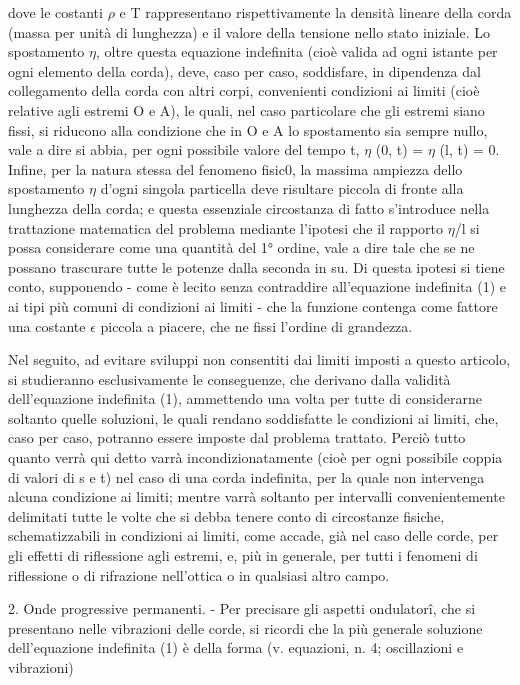 \documentclass[a4paper]{article}
\begin{document}
dove le costanti $\rho$ e T rappresentano rispettivamente la densità lineare della corda (massa per unità di lunghezza) e il valore della tensione nello stato iniziale. Lo spostamento $\eta$, oltre questa equazione indefinita (cioè valida ad ogni istante per ogni elemento della corda), deve, caso per caso, soddisfare, in dipendenza dal collegamento della corda con altri corpi, convenienti condizioni ai limiti (cioè relative agli estremi O e A), le quali, nel caso particolare che gli estremi siano fissi, si riducono alla condizione che in O e A lo spostamento sia sempre nullo, vale a dire si abbia, per ogni possibile valore del tempo t, $\eta$ (0, t) = $\eta$ (l, t) = 0. Infine, per la natura stessa del fenomeno fisic0, la massima ampiezza dello spostamento $\eta$ d'ogni singola particella deve risultare piccola di fronte alla lunghezza della corda; e questa essenziale circostanza di fatto s'introduce nella trattazione matematica del problema mediante l'ipotesi che il rapporto $\eta$/l si possa considerare come una quantità del 1° ordine, vale a dire tale che se ne possano trascurare tutte le potenze dalla seconda in su. Di questa ipotesi si tiene conto, supponendo - come è lecito senza contraddire all'equazione indefinita (1) e ai tipi più comuni di condizioni ai limiti - che la funzione contenga come fattore una costante $\epsilon$ piccola a piacere, che ne fissi l'ordine di grandezza.

Nel seguito, ad evitare sviluppi non consentiti dai limiti imposti a questo articolo, si studieranno esclusivamente le conseguenze, che derivano dalla validità dell'equazione indefinita (1), ammettendo una volta per tutte di considerarne soltanto quelle soluzioni, le quali rendano soddisfatte le condizioni ai limiti, che, caso per caso, potranno essere imposte dal problema trattato. Perciò tutto quanto verrà qui detto varrà incondizionatamente (cioè per ogni possibile coppia di valori di s e t) nel caso di una corda indefinita, per la quale non intervenga alcuna condizione ai limiti; mentre varrà soltanto per intervalli convenientemente delimitati tutte le volte che si debba tenere conto di circostanze fisiche, schematizzabili in condizioni ai limiti, come accade, già nel caso delle corde, per gli effetti di riflessione agli estremi, e, più in generale, per tutti i fenomeni di riflessione o di rifrazione nell'ottica o in qualsiasi altro campo.

2. Onde progressive permanenti. - Per precisare gli aspetti ondulatorî, che si presentano nelle vibrazioni delle corde, si ricordi che la più generale soluzione dell'equazione indefinita (1) è della forma (v. equazioni, n. 4; oscillazioni e vibrazioni)
\end{document}
